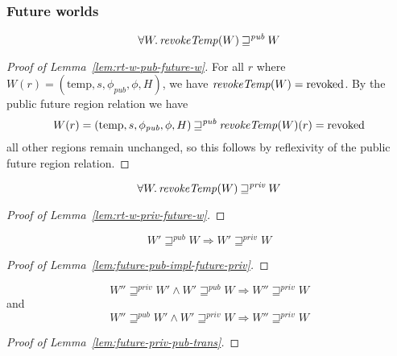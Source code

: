 \documentclass[a4paper]{article}
\newcommand{\var}[1]{\mathit{#1}}
\newcommand{\plainfun}[2]{
  \ifthenelse{\equal{#2}{}}
  {\mathit{#1}}
  {\mathit{#1}(#2)}
}
\newcommand{\revokeTemp}[1]{\plainfun{revokeTemp}{#1}}
\newcommand{\pub}{\var{pub}}
\newcommand{\futurewk}{\mathbin{\sqsupseteq}^{\var{pub}}}
\newcommand{\futurestr}{\mathbin{\sqsupseteq}^{\var{priv}}}
\newcommand{\plainview}[1]{\mathrm{#1}}
\newcommand{\temp}{\plainview{temp}}
\newcommand{\revoked}{\plainview{revoked}}
\begin{document}
\subsubsection{Future worlds}
\begin{lemma}
  \label{lem:rt-w-pub-future-w}
  \[
    \forall W \ldotp \revokeTemp{W} \futurewk W
  \]
\end{lemma}
\begin{proof}[Proof of Lemma~\ref{lem:rt-w-pub-future-w}]
  For all $r$ where $W(r) = (\temp,s,\phi_\pub,\phi,H)$, we have $\revokeTemp{W} = \revoked$. By the public future region relation we have
  \[
    W(r) = (\temp,s,\phi_\pub,\phi,H) \futurewk \revokeTemp{W}(r) = \revoked
  \]
  all other regions remain unchanged, so this follows by reflexivity of the public future region relation.
\end{proof}

\begin{lemma}
  \label{lem:rt-w-priv-future-w}
  \[
    \forall W \ldotp \wrev{W} \futurestr W
  \]
\end{lemma}
\begin{proof}[Proof of Lemma~\ref{lem:rt-w-priv-future-w}]
\end{proof}

\begin{lemma}
  \label{lem:future-pub-impl-future-priv}
  \[
   W' \futurewk W \Rightarrow W' \futurestr W
  \]
\end{lemma}
\begin{proof}[Proof of Lemma~\ref{lem:future-pub-impl-future-priv}]
\end{proof}

\begin{lemma}
  \label{lem:future-priv-pub-trans}
\[
  W'' \futurestr W' \land W' \futurewk W \Rightarrow W'' \futurestr W
\]
and
\[
  W'' \futurewk W' \land W' \futurestr W \Rightarrow W'' \futurestr W
\]
\end{lemma}
\begin{proof}[Proof of Lemma~\ref{lem:future-priv-pub-trans}]
\end{proof}
\end{document}
